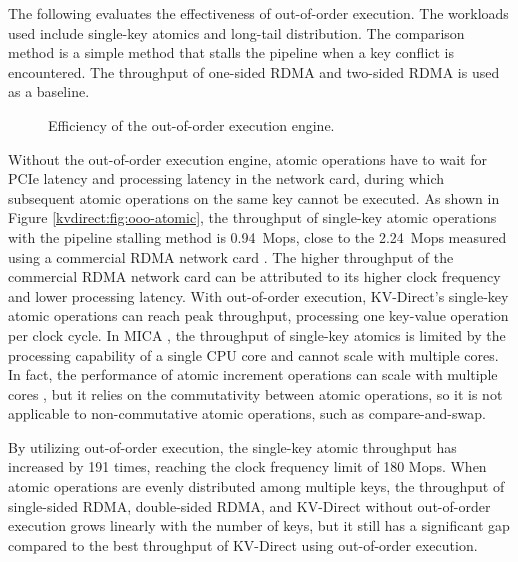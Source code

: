 \label{kvdirect:sec:ooo-eval}

The following evaluates the effectiveness of out-of-order execution. The workloads used include single-key atomics and long-tail distribution. The comparison method is a simple method that stalls the pipeline when a key conflict is encountered. The throughput of one-sided RDMA and two-sided RDMA \cite{kalia2016design} is used as a baseline.

\begin{figure}[htbp]
	\centering
	\caption{Efficiency of the out-of-order execution engine.}
	\label{kvdirect:fig:ooo-eval}
\end{figure}

Without the out-of-order execution engine, atomic operations have to wait for PCIe latency and processing latency in the network card, during which subsequent atomic operations on the same key cannot be executed. As shown in Figure \ref{kvdirect:fig:ooo-atomic}, the throughput of single-key atomic operations with the pipeline stalling method is 0.94~Mops, close to the 2.24~Mops measured using a commercial RDMA network card \cite{kalia2016design}. The higher throughput of the commercial RDMA network card can be attributed to its higher clock frequency and lower processing latency. With out-of-order execution, KV-Direct's single-key atomic operations can reach peak throughput, processing one key-value operation per clock cycle. In MICA \cite{lim2014mica}, the throughput of single-key atomics is limited by the processing capability of a single CPU core and cannot scale with multiple cores. In fact, the performance of atomic increment operations can scale with multiple cores \cite{kalia2016design}, but it relies on the commutativity between atomic operations, so it is not applicable to non-commutative atomic operations, such as compare-and-swap.

By utilizing out-of-order execution, the single-key atomic throughput has increased by 191 times, reaching the clock frequency limit of 180 Mops. When atomic operations are evenly distributed among multiple keys, the throughput of single-sided RDMA, double-sided RDMA, and KV-Direct without out-of-order execution grows linearly with the number of keys, but it still has a significant gap compared to the best throughput of KV-Direct using out-of-order execution.

